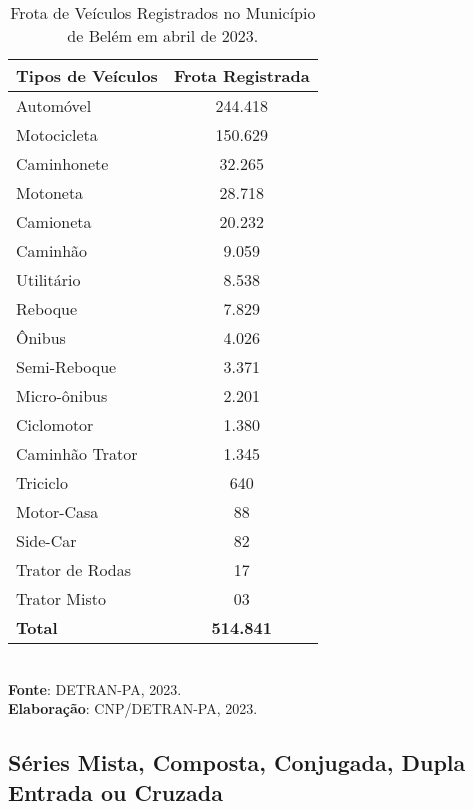 \begin{table}[!htb]
    \centering
    {
    \caption{Frota de Veículos Registrados no Município de Belém em abril de 2023.}
    \label{obitos2}
    \vspace{0.1cm}
\begin{tabular}{l|c}
\hline\hline
\textbf{Tipos de Veículos}   & \textbf{Frota Registrada} \\
\hline\hline
Automóvel       &  244.418   \\
Motocicleta     &  150.629 \\
Caminhonete     &  32.265  \\
Motoneta        &  28.718  \\
Camioneta       &  20.232  \\
Caminhão        &  9.059   \\
Utilitário      &  8.538   \\
Reboque         &  7.829   \\ 
Ônibus          &  4.026   \\
Semi-Reboque    &  3.371   \\
Micro-ônibus    &  2.201   \\
Ciclomotor      &  1.380   \\
Caminhão Trator &  1.345   \\
Triciclo        &  640     \\
Motor-Casa      &  88      \\
Side-Car        &  82      \\
Trator de Rodas &  17      \\
Trator Misto    &  03     \\
\hline\hline
\textbf{Total}  & \textbf{514.841}   \\
\hline\hline
\end{tabular}}
\\
\hspace{-2.6cm} 
\textbf{Fonte}: DETRAN-PA, 2023. \\ 
\hspace{-1.0cm}
\textbf{Elaboração}: CNP/DETRAN-PA, 2023.
\end{table}





\newpage
\subsection{Séries Mista, Composta, Conjugada, Dupla Entrada ou Cruzada}


